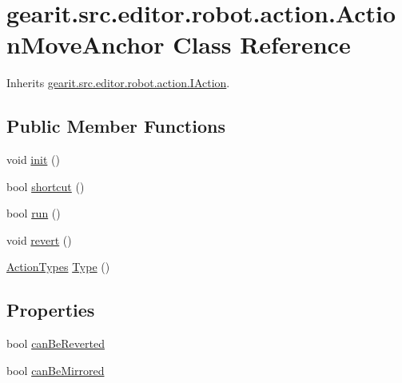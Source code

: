 \hypertarget{classgearit_1_1src_1_1editor_1_1robot_1_1action_1_1_action_move_anchor}{\section{gearit.\+src.\+editor.\+robot.\+action.\+Action\+Move\+Anchor Class Reference}
\label{classgearit_1_1src_1_1editor_1_1robot_1_1action_1_1_action_move_anchor}
}


Inherits \hyperlink{interfacegearit_1_1src_1_1editor_1_1robot_1_1action_1_1_i_action}{gearit.\+src.\+editor.\+robot.\+action.\+I\+Action}.

\subsection*{Public Member Functions}
\begin{DoxyCompactItemize}
\item 
void \hyperlink{classgearit_1_1src_1_1editor_1_1robot_1_1action_1_1_action_move_anchor_ad8b16fd008fbe2c7ba1016f617172bff}{init} ()
\item 
bool \hyperlink{classgearit_1_1src_1_1editor_1_1robot_1_1action_1_1_action_move_anchor_aa1eae7de709047811460f09f801c5e49}{shortcut} ()
\item 
bool \hyperlink{classgearit_1_1src_1_1editor_1_1robot_1_1action_1_1_action_move_anchor_ade378aaa1053b6726dba17c46c198165}{run} ()
\item 
void \hyperlink{classgearit_1_1src_1_1editor_1_1robot_1_1action_1_1_action_move_anchor_aa97a0cebaedb5605028e148919631dea}{revert} ()
\item 
\hyperlink{namespacegearit_1_1src_1_1editor_1_1robot_1_1action_a4be0fd46e3952d6135136b20e7b3fc5e}{Action\+Types} \hyperlink{classgearit_1_1src_1_1editor_1_1robot_1_1action_1_1_action_move_anchor_a755a3c121447e97f02bb950db555f222}{Type} ()
\end{DoxyCompactItemize}
\subsection*{Properties}
\begin{DoxyCompactItemize}
\item 
bool \hyperlink{classgearit_1_1src_1_1editor_1_1robot_1_1action_1_1_action_move_anchor_ae8b39bfc7843941bf4288c3a0e8daffd}{can\+Be\+Reverted}
\item 
bool \hyperlink{classgearit_1_1src_1_1editor_1_1robot_1_1action_1_1_action_move_anchor_a01f9124ee9afe6e128ab1b3aebaba25b}{can\+Be\+Mirrored}
\end{DoxyCompactItemize}


